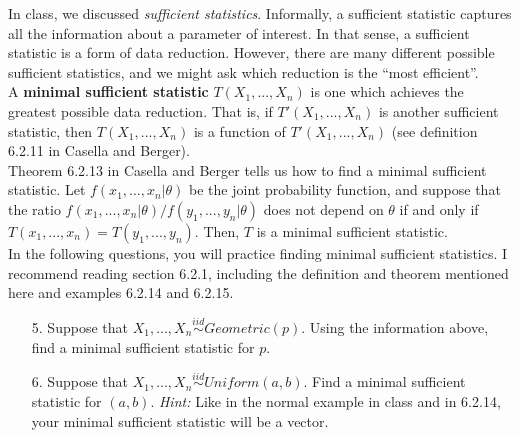 \documentclass[11pt]{article}
\begin{document}
In class, we discussed \textit{sufficient statistics}. Informally, a sufficient statistic captures all the information about a parameter of interest. In that sense, a sufficient statistic is a form of data reduction. However, there are many different possible sufficient statistics, and we might ask which reduction is the ``most efficient''.\\

\noindent A \textbf{minimal sufficient statistic} $T(X_1,...,X_n)$ is one which achieves the greatest possible data reduction. That is, if $T'(X_1,...,X_n)$ is another sufficient statistic, then $T(X_1,...,X_n)$ is a function of $T'(X_1,...,X_n)$ (see definition 6.2.11 in Casella and Berger).\\

\noindent Theorem 6.2.13 in Casella and Berger tells us how to find a minimal sufficient statistic. Let $f(x_1,...,x_n | \theta)$ be the joint probability function, and suppose that the ratio $f(x_1,...,x_n | \theta) / f(y_1,...,y_n | \theta)$ does not depend on $\theta$ if and only if $T(x_1,...,x_n) = T(y_1,...,y_n)$. Then, $T$ is a minimal sufficient statistic.\\

\noindent In the following questions, you will practice finding minimal sufficient statistics. I recommend reading section 6.2.1, including the definition and theorem mentioned here and examples 6.2.14 and 6.2.15.

\begin{enumerate}
\item[5.] Suppose that $X_1,...,X_n \overset{iid}{\sim} Geometric(p)$. Using the information above, find a minimal sufficient statistic for $p$.

\item[6.] Suppose that $X_1,...,X_n \overset{iid}{\sim} Uniform(a,b)$. Find a minimal sufficient statistic for $(a,b)$. \textit{Hint:} Like in the normal example in class and in 6.2.14, your minimal sufficient statistic will be a vector.
\end{enumerate}
\end{document}
